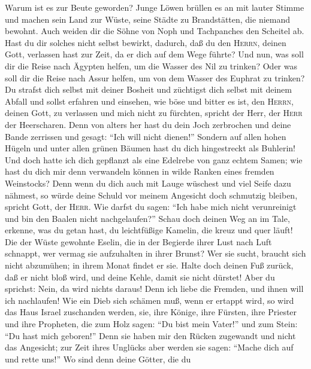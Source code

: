 Warum ist es zur Beute geworden?  Junge Löwen brüllen es
an mit lauter Stimme und machen sein Land zur Wüste, seine Städte zu
Brandstätten, die niemand bewohnt.  Auch weiden dir die
Söhne von Noph und Tachpanches den Scheitel ab.  Hast du
dir solches nicht selbst bewirkt, dadurch, daß du den \textsc{Herrn},
deinen Gott, verlassen hast zur Zeit, da er dich auf dem Wege führte?
 Und nun, was soll dir die Reise nach Ägypten helfen, um
die Wasser des Nil zu trinken? Oder was soll dir die Reise nach Assur
helfen, um von dem Wasser des Euphrat zu trinken?  Du
strafst dich selbst mit deiner Bosheit und züchtigst dich selbst mit
deinem Abfall und sollst erfahren und einsehen, wie böse und bitter es
ist, den \textsc{Herrn}, deinen Gott, zu verlassen und mich nicht zu
fürchten, spricht der Herr, der \textsc{Herr} der Heerscharen.
 Denn von alters her hast du dein Joch zerbrochen und
deine Bande zerrissen und gesagt: ``Ich will nicht dienen!'' Sondern auf
allen hohen Hügeln und unter allen grünen Bäumen hast du dich
hingestreckt als Buhlerin!  Und doch hatte ich dich
gepflanzt als eine Edelrebe von ganz echtem Samen; wie hast du dich mir
denn verwandeln können in wilde Ranken eines fremden Weinstocks?
 Denn wenn du dich auch mit Lauge wüschest und viel Seife
dazu nähmest, so würde deine Schuld vor meinem Angesicht doch schmutzig
bleiben, spricht Gott, der \textsc{Herr}.  Wie darfst du
sagen: ``Ich habe mich nicht verunreinigt und bin den Baalen nicht
nachgelaufen?'' Schau doch deinen Weg an im Tale, erkenne, was du getan
hast, du leichtfüßige Kamelin, die kreuz und quer läuft! 
Die der Wüste gewohnte Eselin, die in der Begierde ihrer Lust nach Luft
schnappt, wer vermag sie aufzuhalten in ihrer Brunst? Wer sie sucht,
braucht sich nicht abzumühen; in ihrem Monat findet er sie.
 Halte doch deinen Fuß zurück, daß er nicht bloß wird,
und deine Kehle, damit sie nicht dürstet! Aber du sprichst: Nein, da
wird nichts daraus! Denn ich liebe die Fremden, und ihnen will ich
nachlaufen!  Wie ein Dieb sich schämen muß, wenn er
ertappt wird, so wird das Haus Israel zuschanden werden, sie, ihre
Könige, ihre Fürsten, ihre Priester und ihre Propheten, 
die zum Holz sagen: ``Du bist mein Vater!'' und zum Stein: ``Du hast
mich geboren!'' Denn sie haben mir den Rücken zugewandt und nicht das
Angesicht; zur Zeit ihres Unglücks aber werden sie sagen: ``Mache dich
auf und rette uns!''  Wo sind denn deine Götter, die du

